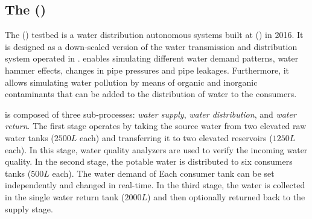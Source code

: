 \documentclass[sigconf]{acmart}
\makeatletter
\newcommand{\eg}{e.\@\,g.,\@\xspace}
\makeatother
\begin{document}





\subsection{The \wadilong (\wadi)}
\label{sec:wadi}

The \wadilong (\wadi) testbed is a water distribution autonomous
systems built at \sutdlong (\sutd) in 2016. It is designed as a
down-scaled version of the water transmission and distribution system
operated in \singapore.  \wadi enables simulating different water
demand patterns, water hammer effects, changes in pipe pressures and
pipe leakages. Furthermore, it allows simulating water
pollution by means of organic and inorganic contaminants that can be
added to the distribution of water to the consumers.

\wadi is composed of three sub-processes: \emph{water supply},
\emph{water distribution}, and \emph{water return}. The first stage operates
by taking the source water from two elevated raw water tanks ($2500 L$ each) and
transferring it to two elevated reservoirs ($1250 L$ each). In this stage,
water quality analyzers are used to verify the incoming water quality. In
the second stage, the potable water is distributed
to six consumers tanks ($500 L$ each). The water demand of Each consumer tank
can be set independently and changed in real-time. In the third stage, the
water is collected in the single water return tank ($2000 L$) and then
optionally returned back to the supply stage.
\end{document}
